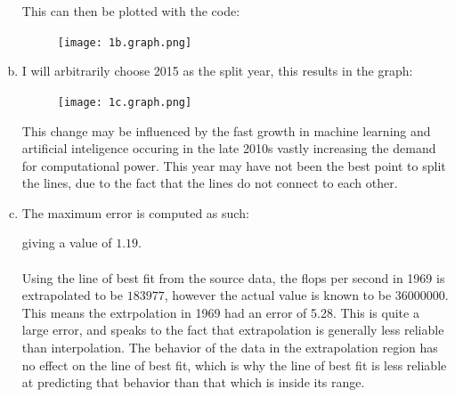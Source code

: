\documentclass[11pt]{article}
\begin{document}
\begin{enumerate}[a)]
  This can then be plotted with the code:
  
  \begin{figure}[H]
    \centering
    \texttt{[image: 1b.graph.png]}
  \end{figure}
\item I will arbitrarily choose 2015 as the split year, this results in the graph:
  \begin{figure}[H]
    \centering
    \texttt{[image: 1c.graph.png]}
  \end{figure}
  This change may be influenced by the fast growth in machine learning and artificial inteligence occuring in the late 2010s vastly increasing the demand for computational power.
  This year may have not been the best point to split the lines, due to the fact that the lines do not connect to each other.
\item The maximum error is computed as such:
  
  giving a value of $1.19$.
  \\\\
  Using the line of best fit from the source data, the flops per second in 1969 is extrapolated to be $183977$, however the actual value is known to be $36000000$.
  This means the extrpolation in 1969 had an error of 5.28. This is quite a large error, and speaks to the fact that extrapolation is generally less reliable than interpolation.
  The behavior of the data in the extrapolation region has no effect on the line of best fit, which is why the line of best fit is less reliable at predicting that behavior than that which is inside its range.
\end{enumerate}
\end{document}
